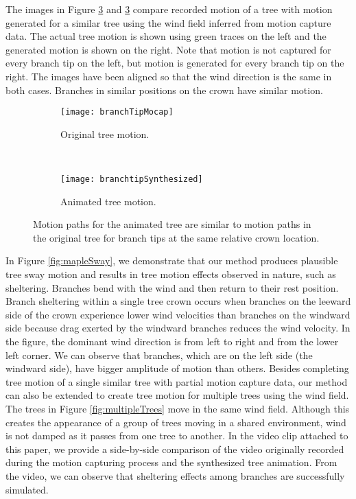 The images in Figure \ref{fig:motionPaths} and \ref{fig:motionPaths} compare recorded motion of a tree with motion generated for a similar tree using the wind field inferred from motion capture data.  The actual tree motion is shown using green traces on the left and the generated motion is shown on the right.  Note that motion is not captured for every branch tip on the left, but motion is generated for every branch tip on the right.  The images have been aligned so that the wind direction is the same in both cases.  Branches in similar positions on the crown have similar motion. 

\begin{figure}
\centering
        \begin{subfigure}[b]{0.29\textwidth}
                \centering
                \texttt{[image: branchTipMocap]}
                \caption{Original tree motion.}
                \label{fig:branchTipMocap}
        \end{subfigure}%
        ~
        \begin{subfigure}[b]{0.3\textwidth}
                \centering
                \texttt{[image: branchtipSynthesized]}
                \caption{Animated tree motion.}
                \label{fig:branchtipSynthesized}
        \end{subfigure}       
        \caption[Motion paths for the animated tree. ]{Motion paths for the animated tree are similar to motion paths in the original tree for branch tips at the same relative crown location.}
        \label{fig:motionPaths}
\end{figure}

In Figure \ref{fig:mapleSway}, we demonstrate that our method produces plausible tree sway motion and results in tree motion effects observed in nature, such as sheltering.  Branches bend with the wind and then return to their rest position.  Branch sheltering within a single tree crown occurs when branches on the leeward side of the crown experience lower wind velocities than branches on the windward side because drag exerted by the windward branches reduces the wind velocity.  In the figure, the dominant wind direction is from left to right and from the lower left corner. We can observe that branches, which are on the left side (the windward side), have bigger amplitude of motion than others. Besides completing tree motion of a single similar tree with partial motion capture data, our method can also be extended to create tree motion for multiple trees using the wind field.  The trees in Figure \ref{fig:multipleTrees} move in the same wind field.  Although this creates the appearance of a group of trees moving in a shared environment, wind is not damped as it passes from one tree to another.  In the video clip attached to this paper, we provide a side-by-side comparison of the video originally recorded during the motion capturing process and the synthesized tree animation. From the video, we can observe that sheltering effects among branches are successfully simulated. 

